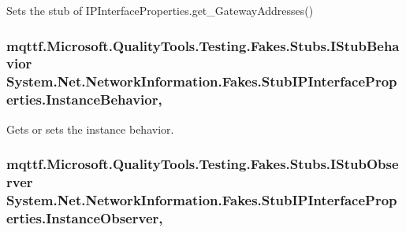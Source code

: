 Sets the stub of I\-P\-Interface\-Properties.\-get\-\_\-\-Gateway\-Addresses()

\hypertarget{class_system_1_1_net_1_1_network_information_1_1_fakes_1_1_stub_i_p_interface_properties_a75ade947c30fe3e4645b0a302361a4c7}{
\subsubsection[{Instance\-Behavior}]{\setlength{\rightskip}{0pt plus 5cm}mqttf.\-Microsoft.\-Quality\-Tools.\-Testing.\-Fakes.\-Stubs.\-I\-Stub\-Behavior System.\-Net.\-Network\-Information.\-Fakes.\-Stub\-I\-P\-Interface\-Properties.\-Instance\-Behavior\hspace{0.3cm}{\ttfamily [get]}, {\ttfamily [set]}}}\label{class_system_1_1_net_1_1_network_information_1_1_fakes_1_1_stub_i_p_interface_properties_a75ade947c30fe3e4645b0a302361a4c7}


Gets or sets the instance behavior.

\hypertarget{class_system_1_1_net_1_1_network_information_1_1_fakes_1_1_stub_i_p_interface_properties_a07a861ee12f1e3562c1f7d3488fcfc08}{
\subsubsection[{Instance\-Observer}]{\setlength{\rightskip}{0pt plus 5cm}mqttf.\-Microsoft.\-Quality\-Tools.\-Testing.\-Fakes.\-Stubs.\-I\-Stub\-Observer System.\-Net.\-Network\-Information.\-Fakes.\-Stub\-I\-P\-Interface\-Properties.\-Instance\-Observer\hspace{0.3cm}{\ttfamily [get]}, {\ttfamily [set]}}}\label{class_system_1_1_net_1_1_network_information_1_1_fakes_1_1_stub_i_p_interface_properties_a07a861ee12f1e3562c1f7d3488fcfc08}



